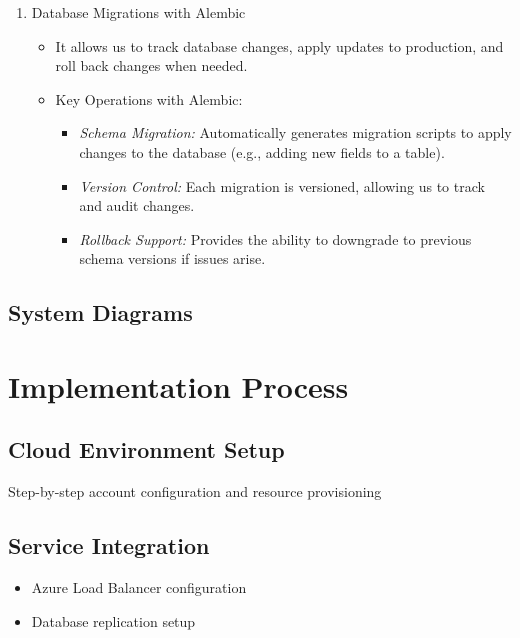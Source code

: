\documentclass{llncs}
\begin{document}
\begin{enumerate}
\begin{itemize}
\begin{itemize}
\begin{itemize}
            \end{itemize}
        \end{itemize}
    \end{itemize}
    \item  Database Migrations with Alembic \\
    \begin{itemize}
        \item It allows us to track database changes, apply updates to production, and roll back changes when needed.
        \item Key Operations with Alembic:
        \begin{itemize}
            \item \textit{Schema Migration:} Automatically generates migration scripts to apply changes to the database (e.g., adding new fields to a table).
            \item \textit{Version Control:} Each migration is versioned, allowing us to track and audit changes.
            \item \textit{Rollback Support:} Provides the ability to downgrade to previous schema versions if issues arise.\\  
        \end{itemize}
    \end{itemize}
    \end{enumerate}

\subsection{System Diagrams}

\section{Implementation Process}
\subsection{Cloud Environment Setup}
Step-by-step account configuration and resource provisioning

\subsection{Service Integration}
\begin{itemize}
    \item Azure Load Balancer configuration
    \item Database replication setup
\end{itemize}
\end{document}
